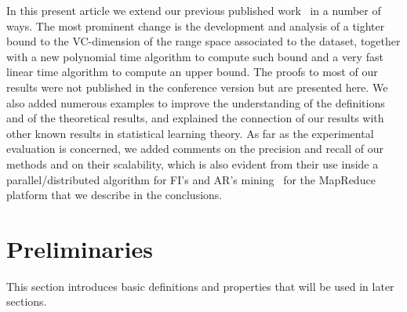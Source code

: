 In this present article we extend our previous published work~\citep{RiondatoU12}
in a number of ways. The most prominent change is the development and analysis
of a tighter bound to the VC-dimension of the range space associated to the
dataset, together with a new polynomial time algorithm to compute such bound and
a very fast linear time algorithm to compute an upper bound. The proofs to most
of our results were not published in the conference version but are presented
here. We also added numerous examples to improve the understanding of the
definitions and of the theoretical results, and explained the connection of our
results with other known results in statistical learning theory. As far as the
experimental evaluation is concerned, we added comments on the precision and
recall of our methods and on their scalability, which is also evident from their
use inside a parallel/distributed algorithm for FI's and AR's
mining~\citep{RiondatoDFU12} for the MapReduce~\citep{DeanS04} platform that we
describe in the conclusions.

\section{Preliminaries}\label{sec:prelim}

This section introduces basic definitions and properties that will be used in later sections.


